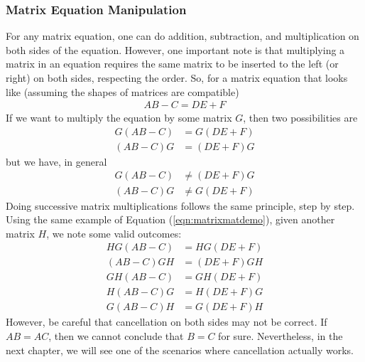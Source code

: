 \subsubsection{Matrix Equation Manipulation}
For any matrix equation, one can do addition, subtraction, and multiplication on both sides of the equation. However, one important note is that multiplying a matrix in an equation requires the same matrix to be inserted to the left (or right) on both sides, respecting the order. So, for a matrix equation that looks like (assuming the shapes of matrices are compatible)
\begin{align}
AB-C = DE+F \label{eqn:matrixmatdemo}
\end{align}
If we want to multiply the equation by some matrix $G$, then two possibilities are
\begin{align*}
G(AB-C) &= G(DE+F) \\
(AB-C)G &= (DE+F)G
\end{align*}
but we have, in general
\begin{align*}
G(AB-C) &\neq (DE+F)G \\
(AB-C)G &\neq G(DE+F)
\end{align*}
Doing successive matrix multiplications follows the same principle, step by step. Using the same example of Equation (\ref{eqn:matrixmatdemo}), given another matrix $H$, we note some valid outcomes:
\begin{align*}
HG(AB-C) &= HG(DE+F) \\
(AB-C)GH &= (DE+F)GH \\
GH(AB-C) &= GH(DE+F) \\
H(AB-C)G &= H(DE+F)G \\
G(AB-C)H &= G(DE+F)H 
\end{align*}
However, be careful that cancellation on both sides may not be correct. If $AB = AC$, then we cannot conclude that $B = C$ for sure. Nevertheless, in the next chapter, we will see one of the scenarios where cancellation actually works.


